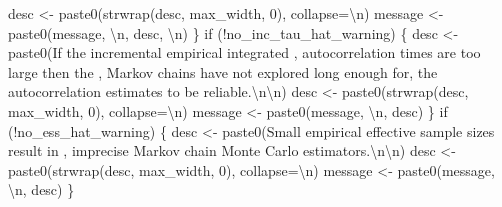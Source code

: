\documentclass[
  letterpaper,
  DIV=11,
  numbers=noendperiod]{scrartcl}
\newenvironment{Shaded}{\begin{snugshade}}{\end{snugshade}}
\newcommand{\CharTok}[1]{\textcolor[rgb]{0.13,0.47,0.30}{#1}}
\newcommand{\ControlFlowTok}[1]{\textcolor[rgb]{0.00,0.23,0.31}{#1}}
\newcommand{\DecValTok}[1]{\textcolor[rgb]{0.68,0.00,0.00}{#1}}
\newcommand{\NormalTok}[1]{\textcolor[rgb]{0.00,0.23,0.31}{#1}}
\newcommand{\OperatorTok}[1]{\textcolor[rgb]{0.37,0.37,0.37}{#1}}
\newcommand{\StringTok}[1]{\textcolor[rgb]{0.13,0.47,0.30}{#1}}
\begin{document}
\begin{Shaded}
\begin{Highlighting}[]
\NormalTok{    desc }\OperatorTok{\textless{}{-}}\NormalTok{ paste0(strwrap(desc, max\_width, }\DecValTok{0}\NormalTok{), collapse}\OperatorTok{=}\StringTok{\textquotesingle{}}\CharTok{\textbackslash{}n}\StringTok{\textquotesingle{}}\NormalTok{)}
\NormalTok{    message }\OperatorTok{\textless{}{-}}\NormalTok{ paste0(message, }\StringTok{\textquotesingle{}}\CharTok{\textbackslash{}n}\StringTok{\textquotesingle{}}\NormalTok{, desc, }\StringTok{\textquotesingle{}}\CharTok{\textbackslash{}n}\StringTok{\textquotesingle{}}\NormalTok{)}
\NormalTok{  \}}
  \ControlFlowTok{if}\NormalTok{ (}\OperatorTok{!}\NormalTok{no\_inc\_tau\_hat\_warning) \{}
\NormalTok{    desc }\OperatorTok{\textless{}{-}}\NormalTok{ paste0(}\StringTok{\textquotesingle{}If the incremental empirical integrated \textquotesingle{}}\NormalTok{,}
                   \StringTok{\textquotesingle{}autocorrelation times are too large then the \textquotesingle{}}\NormalTok{,}
                   \StringTok{\textquotesingle{}Markov chains have not explored long enough for\textquotesingle{}}\NormalTok{,}
                   \StringTok{\textquotesingle{}the autocorrelation estimates to be reliable.}\CharTok{\textbackslash{}n\textbackslash{}n}\StringTok{\textquotesingle{}}\NormalTok{)}
\NormalTok{    desc }\OperatorTok{\textless{}{-}}\NormalTok{ paste0(strwrap(desc, max\_width, }\DecValTok{0}\NormalTok{), collapse}\OperatorTok{=}\StringTok{\textquotesingle{}}\CharTok{\textbackslash{}n}\StringTok{\textquotesingle{}}\NormalTok{)}
\NormalTok{    message }\OperatorTok{\textless{}{-}}\NormalTok{ paste0(message, }\StringTok{\textquotesingle{}}\CharTok{\textbackslash{}n}\StringTok{\textquotesingle{}}\NormalTok{, desc)}
\NormalTok{  \}}
  \ControlFlowTok{if}\NormalTok{ (}\OperatorTok{!}\NormalTok{no\_ess\_hat\_warning) \{}
\NormalTok{    desc }\OperatorTok{\textless{}{-}}\NormalTok{ paste0(}\StringTok{\textquotesingle{}Small empirical effective sample sizes result in \textquotesingle{}}\NormalTok{,}
                   \StringTok{\textquotesingle{}imprecise Markov chain Monte Carlo estimators.}\CharTok{\textbackslash{}n\textbackslash{}n}\StringTok{\textquotesingle{}}\NormalTok{)}
\NormalTok{    desc }\OperatorTok{\textless{}{-}}\NormalTok{ paste0(strwrap(desc, max\_width, }\DecValTok{0}\NormalTok{), collapse}\OperatorTok{=}\StringTok{\textquotesingle{}}\CharTok{\textbackslash{}n}\StringTok{\textquotesingle{}}\NormalTok{)}
\NormalTok{    message }\OperatorTok{\textless{}{-}}\NormalTok{ paste0(message, }\StringTok{\textquotesingle{}}\CharTok{\textbackslash{}n}\StringTok{\textquotesingle{}}\NormalTok{, desc)}
\NormalTok{  \}}


\end{Highlighting}
\end{Shaded}
\end{document}
